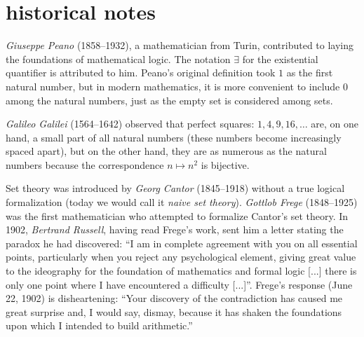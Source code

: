 \section{historical notes}

\label{nota:Peano}%
%
\emph{Giuseppe Peano} (1858--1932), a mathematician from Turin, contributed to laying the foundations of mathematical logic. The notation $\exists$ for the existential quantifier is attributed to him. Peano's original definition took $1$ as the first natural number, but in modern mathematics, it is more convenient to include $0$ among the natural numbers, just as the empty set is considered among sets.

\label{nota:Galileo}%
%
\emph{Galileo Galilei} (1564--1642) observed that perfect squares: $1,4,9,16,\dots$ are, on one hand, a small part of all natural numbers (these numbers become increasingly spaced apart), but on the other hand, they are as numerous as the natural numbers because the correspondence $n\mapsto n^2$ is bijective.

\label{nota:Cantor}%
%
\label{nota:Russell}%
%
\label{nota:Frege}%
%
Set theory was introduced by \emph{Georg Cantor} (1845--1918) without a true
logical formalization (today we would call it \emph{naive set theory}).
\emph{Gottlob Frege} (1848--1925) was the first mathematician who attempted to
formalize Cantor's set theory. In 1902, \emph{Bertrand Russell}, having read
Frege's work, sent him a letter stating the paradox he had discovered: ``I am in
complete agreement with you on all essential points, particularly when you
reject any psychological element, giving great value to the ideography for the
foundation of mathematics and formal logic [...] there is only one point where I
have encountered a difficulty [...]''. Frege's response (June 22, 1902) is
disheartening: ``Your discovery of the contradiction has caused me great
surprise and, I would say, dismay, because it has shaken the foundations upon
which I intended to build arithmetic.''

